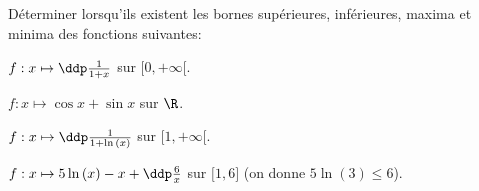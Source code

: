 
\begin{exercice}  \;
D\'eterminer lorsqu'ils existent les bornes sup\'erieures, inf\'erieures, maxima et minima des fonctions suivantes:
\begin{enumerate}
\begin{minipage}[t]{0.4\textwidth}
\item $f: x\mapsto \ddp\frac{1}{1+x}  $ sur $\lbrack 0,+\infty\lbrack$.
\item $f: x\mapsto \cos{x}+\sin{x}$ sur $\R$.
\end{minipage}
\begin{minipage}[t]{0.5\textwidth}
\item $f: x\mapsto \ddp\frac{1}{1+\ln{(x)}}$ sur $\lbrack 1,+\infty\lbrack$. 
\item $f: x\mapsto 5\ln{(x)}-x+\ddp\frac{6}{x}$ sur $\lbrack 1,6\rbrack$ (on donne $5\ln{(3)}\leq 6$).
\end{minipage}
\end{enumerate}
\end{exercice}